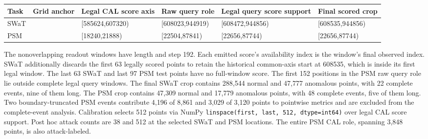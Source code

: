 \documentclass[
  american,
]{article}
\begin{document}
\begin{longtable}[]{@{}
  >{\raggedright\arraybackslash}p{}
  >{\raggedleft\arraybackslash}p{}
  >{\raggedright\arraybackslash}p{}
  >{\raggedright\arraybackslash}p{}
  >{\raggedright\arraybackslash}p{}
  >{\raggedright\arraybackslash}p{}@{}}
\toprule\noalign{}
\begin{minipage}[b]{\linewidth}\raggedright
Task
\end{minipage} & \begin{minipage}[b]{\linewidth}\raggedleft
Grid anchor
\end{minipage} & \begin{minipage}[b]{\linewidth}\raggedright
Legal CAL score axis
\end{minipage} & \begin{minipage}[b]{\linewidth}\raggedright
Raw query role
\end{minipage} & \begin{minipage}[b]{\linewidth}\raggedright
Legal query score support
\end{minipage} & \begin{minipage}[b]{\linewidth}\raggedright
Final scored crop
\end{minipage} \\
\midrule\noalign{}
\endhead
\bottomrule\noalign{}
\endlastfoot
SWaT & 495000 & {[}585624,607320) & {[}608023,944919) &
{[}608472,944856) & {[}608535,944856) \\
PSM & 0 & {[}18240,21888) & {[}22504,87841) & {[}22656,87744) &
{[}22656,87744) \\
\end{longtable}

The nonoverlapping readout windows have length and step 192. Each
emitted score's availability index is the window's final observed index.
SWaT additionally discards the first 63 legally scored points to retain
the historical common-axis start at 608535, which is inside its first
legal window. The last 63 SWaT and last 97 PSM test points have no
full-window score. The first 152 positions in the PSM raw query role lie
outside complete legal query windows. The final SWaT crop contains
288,544 normal and 47,777 anomalous points, with 22 complete events,
nine of them long. The PSM crop contains 47,309 normal and 17,779
anomalous points, with 48 complete events, five of them long. Two
boundary-truncated PSM events contribute 4,196 of 8,861 and 3,029 of
3,120 points to pointwise metrics and are excluded from the
complete-event analysis. Calibration selects 512 points via NumPy
\texttt{linspace(first,\ last,\ 512,\ dtype=int64)} over legal CAL score
support. Post hoc attack counts are 38 and 512 at the selected SWaT and
PSM locations. The entire PSM CAL role, spanning 3,848 points, is also
attack-labeled.
\end{document}
